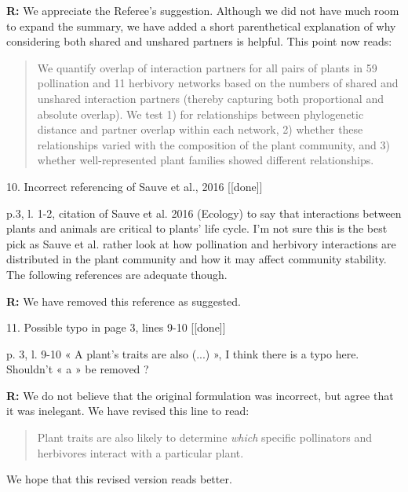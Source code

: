 \documentclass[12pt]{letter}
\newenvironment{refquote}{\bigskip \begin{it}}{\end{it}\smallskip}
\begin{document}
		\textbf{R:} We appreciate the Referee's suggestion. Although we did not have much room to expand the summary, we have added a short parenthetical explanation of why considering both shared and unshared partners is helpful. This point now reads:

		\begin{quotation}

			\item We quantify overlap of interaction partners for all pairs of plants in 59 pollination and 11 herbivory networks based on the numbers of shared and unshared interaction partners (thereby capturing both proportional and absolute overlap). We test 1) for relationships between phylogenetic distance and partner overlap within each network, 2) whether these relationships varied with the composition of the plant community, and 3) whether well-represented plant families showed different relationships. 

		\end{quotation}


	10. Incorrect referencing of Sauve et al., 2016 [[done]]

		\begin{refquote}
			p.3, l. 1-2, citation of Sauve et al. 2016 (Ecology) to say that interactions between plants and animals are critical to plants’ life cycle. I’m not sure this is the best pick as Sauve et al. rather look at how pollination and herbivory interactions are distributed in the plant community and how it may affect community stability. The following references are adequate though.
		\end{refquote}

		\textbf{R:} We have removed this reference as suggested.


	11. Possible typo in page 3, lines 9-10 [[done]]
		
		\begin{refquote}
			p. 3, l. 9-10 « A plant’s traits are also (...) », I think there is a typo here. Shouldn’t « a » be removed ?
		\end{refquote}


		\textbf{R:} We do not believe that the original formulation was incorrect, but agree that it was inelegant. We have revised this line to read:
		\begin{quotation}
			Plant traits are also likely to determine \emph{which} specific pollinators and herbivores interact with a particular plant.
	  	\end{quotation}
	  	We hope that this revised version reads better.
\end{document}
